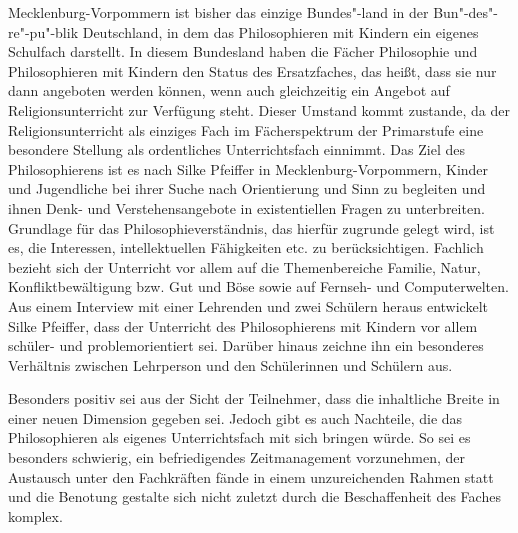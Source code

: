 Mecklenburg-Vorpommern ist bisher das einzige Bundes"-land in der Bun"-des"-re"-pu"-blik Deutschland, in dem das Philosophieren mit Kindern ein eigenes Schulfach darstellt.
In diesem Bundesland haben die Fächer Philosophie und Philosophieren mit Kindern den Status des Ersatzfaches, das heißt, dass sie nur dann angeboten werden können, wenn auch gleichzeitig ein Angebot auf Religionsunterricht zur Verfügung steht.
Dieser Umstand kommt zustande, da der Religionsunterricht als einziges Fach im Fächerspektrum der Primarstufe eine besondere Stellung als ordentliches Unterrichtsfach einnimmt.
Das Ziel des Philosophierens ist es nach Silke Pfeiffer in Mecklenburg-Vorpommern, \glqq Kinder und Jugendliche bei ihrer Suche nach Orientierung und Sinn zu begleiten und ihnen Denk- und Verstehensangebote in existentiellen Fragen zu unterbreiten.\grqq{} \cite[S.\,652]{SP13}
Grundlage für das Philosophieverständnis, das hierfür zugrunde gelegt wird, ist es, die Interessen, intellektuellen Fähigkeiten etc. zu berücksichtigen.
Fachlich bezieht sich der Unterricht vor allem auf die Themenbereiche \glqq Familie\grqq{}, \glqq Natur\grqq{}, \glqq Konfliktbewältigung bzw. Gut und Böse\grqq{} sowie auf \glqq Fernseh- und Computerwelten\grqq{}.
Aus einem Interview mit einer Lehrenden und zwei Schülern heraus entwickelt Silke Pfeiffer, dass der Unterricht des Philosophierens mit Kindern vor allem schüler- und problemorientiert sei.
Darüber hinaus zeichne ihn ein besonderes Verhältnis zwischen Lehrperson und den Schülerinnen und Schülern aus.

Besonders positiv sei aus der Sicht der Teilnehmer, dass die inhaltliche Breite in einer neuen Dimension gegeben sei.
Jedoch gibt es auch Nachteile, die das Philosophieren als eigenes Unterrichtsfach mit sich bringen würde.
So sei es besonders schwierig, ein befriedigendes Zeitmanagement vorzunehmen, der Austausch unter den Fachkräften fände in einem unzureichenden Rahmen statt und die Benotung gestalte sich nicht zuletzt durch die Beschaffenheit des Faches komplex.

